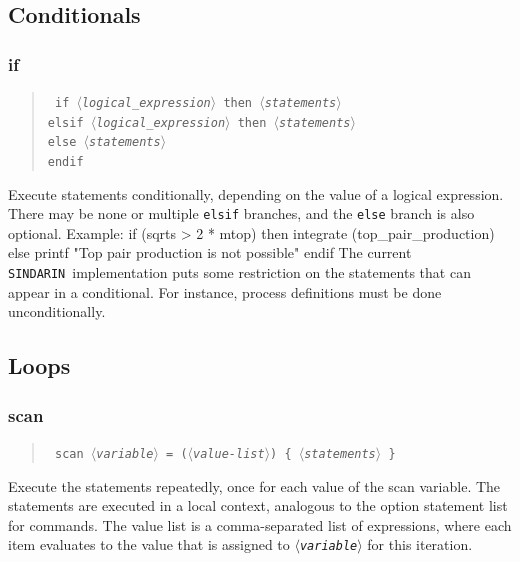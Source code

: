 \documentclass[12pt]{book}
\newenvironment{code}%
  {\begingroup\footnotesize
   \quote
   \Verbatim}%
  {\endVerbatim
   \endquote
   \endgroup\noindent}
\newenvironment{syntax}%
  {\begin{quote}
   \begin{flushleft}\tt}%
  {\end{flushleft}
   \end{quote}}
\newcommand{\var}[1]{$\langle$\textit{#1}$\rangle$}
\newcommand{\ttt}[1]{\texttt{#1}}
\newcommand{\sindarin}{\ttt{SINDARIN}}
\begin{document}
\subsection{Conditionals}

\subsubsection{if}
\begin{syntax}
if \var{logical\_expression} then \var{statements} \\
elsif \var{logical\_expression} then \var{statements} \\
else \var{statements} \\
endif
\end{syntax}
Execute statements conditionally, depending on the value of a logical
expression. There may be none or multiple \ttt{elsif} branches, and
the \ttt{else} branch is also optional.  Example:
\begin{code}
if (sqrts > 2 * mtop) then
  integrate (top_pair_production)
else
  printf "Top pair production is not possible"
endif
\end{code}
The current \sindarin\ implementation puts some restriction on the
statements that can appear in a conditional.  For instance, process
definitions must be done unconditionally.

\subsection{Loops}
\subsubsection{scan}
\begin{syntax}
scan \var{variable} = (\var{value-list}) \{ \var{statements} \}
\end{syntax}
Execute the statements repeatedly, once for each value of the scan
variable.  The statements are executed in a local context, analogous
to the option statement list for commands.  The value list is a
comma-separated list of expressions, where each item evaluates to the
value that is assigned to \ttt{\var{variable}} for this iteration.
\end{document}
